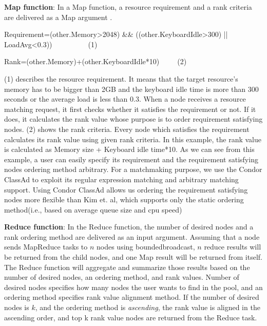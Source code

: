 \documentclass{acm_proc_article-sp}
\begin{document}
\textbf{Map function}: In a Map function, a resource requirement and a rank criteria are delivered as a Map argument .
\begin{flushleft}Requirement=(other.Memory>2048) \&\& ((other.KeyboardIdle>300) || LoadAvg<0.3))\ \ \ \ \ \ \ \ \ \ (1)\end{flushleft}
\begin{flushleft}Rank=(other.Memory)+(other.KeyboardIdle*10)\ \ \ \ \ (2)\end{flushleft}
(1) describes the resource requirement. It means that the target resource's memory has to be bigger than 2GB and the keyboard idle time is more than 300 seconds or the average load is less than 0.3.
When a node receives a resource matching request, it first checks whether it satisfies the requirement or not. If it does, it calculates the rank value whose purpose is to order requirement satisfying nodes.
(2) shows the rank criteria. Every node which satisfies the requirement calculates its rank value using given rank criteria. In this example, the rank value is calculated as Memory size + Keyboard idle time*10.
As we can see from this example, a user can easily specify its requirement and the requirement satisfying nodes ordering method arbitrary.
For a matchmaking purpose, we use the Condor ClassAd\cite{classad} to exploit its regular expression matching and arbitrary matching support.
Using Condor ClassAd allows us ordering the requirement satisfying nodes more flexible than Kim et. al\cite{can_query}, which supports only the static ordering method(i.e., based on average queue size and cpu speed)

\textbf{Reduce function}: In the Reduce function, the number of desired nodes and a rank ordering method are delivered as an input argument.
Assuming that a node sends MapReduce tasks to $n$ nodes using boundedbroadcast, \begin{math}n\end{math} reduce results will be returned from the child nodes, 
and one Map result will be returned from itself. The Reduce function will aggregate and summarize those results based on the number of desired nodes, an ordering method, and rank values. 
Number of desired nodes specifies how many nodes the user wants to find in the pool, and an ordering method specifies rank value alignment method. 
If the number of desired nodes is $k$, and the ordering method is \textit{ascending}, the rank value is aligned in the ascending order, and top k rank value nodes are returned from the Reduce task.
\end{document}
